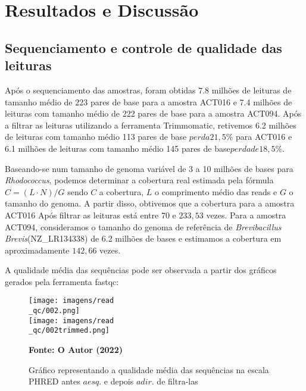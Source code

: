 \chapter{Resultados e Discussão}\label{cap:resultados}

\section{Sequenciamento e controle de qualidade das leituras}
Após o sequenciamento das amostras, foram obtidas 7.8 milhões de leituras de tamanho médio de 
223 pares de base para a amostra ACT016 e 7.4 milhões de leituras com tamanho médio de 222 pares de base
para a amostra ACT094. Após a filtrar as leituras utilizando a ferramenta Trimmomatic, retivemos
6.2 milhões de leituras com tamanho médio 113 pares de base \(perda 21,5\%\) para ACT016 e 6.1 milhões
de leituras com tamanho médio 145 pares de base\(perda de 18,5\%\).

Baseando-se num tamanho de genoma variável de 3 a 10 milhões de bases para \textit{Rhodococcus}, podemos
determinar a cobertura real estimada pela fórmula $C= (L\cdot N)/G $ sendo $C$ a cobertura, $L$ o comprimento
médio das reads e $G$ o tamanho do genoma. A partir disso, obtivemos que a cobertura para a amostra ACT016 Após
filtrar as leituras está entre $70$ e $233,53$ vezes. 
Para a amostra ACT094, consideramos o tamanho do genoma de referência de \textit{Brevibacillus Brevis}(NZ\_LR134338) 
de 6.2 milhões de bases e estimamos a cobertura em aproximadamente $142,66$ vezes.

A qualidade média das sequências pode ser observada a partir dos gráficos gerados pela ferramenta
fastqc:

\begin{figure}[!htb]
	\caption{Gráfico representando a qualidade média das sequências na escala PHRED antes \(a esq.\) e depois \(a dir.\) de filtra-las}
	\label{fig:fastqc_antes}
	\centering
	\texttt{[image: imagens/read\\\_qc/002.png]} \\
    \texttt{[image: imagens/read\\\_qc/002trimmed.png]} \\
    \begin{small}\textbf{Fonte: O Autor (2022)}\end{small}
\end{figure}
